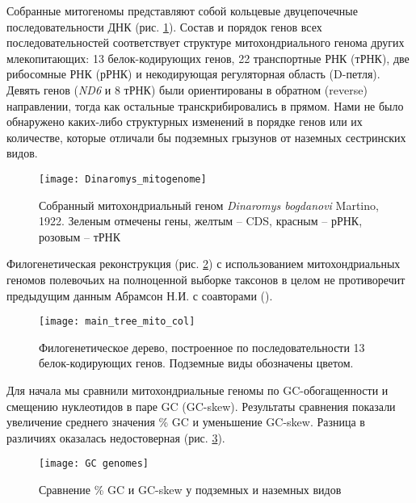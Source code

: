 Собранные митогеномы представляют собой кольцевые двуцепочечные последовательности ДНК (рис. \ref{mitogenome}). Состав и порядок генов всех последовательностей соответствует структуре митохондриального генома других млекопитающих: 13 белок-кодирующих генов, 22 транспортные РНК (тРНК), две рибосомные РНК (рРНК) и некодирующая регуляторная область (D-петля). Девять генов (\textit{ND6} и 8 тРНК) были ориентированы в обратном (reverse) направлении, тогда как остальные транскрибировались в прямом. Нами не было обнаружено каких-либо структурных изменений в порядке генов или их количестве, которые отличали бы подземных грызунов от наземных сестринских видов.

\begin{figure}[h!]
	\begin{center}
		\texttt{[image: Dinaromys\_mitogenome]}
	\end{center}
	\caption{Собранный митохондриальный геном \textit{Dinaromys bogdanovi} Martino, 1922. Зеленым отмечены гены, желтым -- CDS, красным -- рРНК, розовым -- тРНК}\label{mitogenome}
\end{figure}

Филогенетическая реконструкция (рис. \ref{Tree_13_genes}) с использованием митохондриальных геномов полевочьих на полноценной выборке таксонов в целом не противоречит предыдущим данным Абрамсон Н.И. с соавторами (\cite{Abramson2009}).  

\begin{figure}[h!]
\begin{center}
	\texttt{[image: main\_tree\_mito\_col]}
\end{center}
	\caption{Филогенетическое дерево, построенное по последовательности 13 белок-кодирующих генов. Подземные виды обозначены цветом.}
	\label{Tree_13_genes}
\end{figure}


Для начала мы сравнили митохондриальные геномы по GC-обогащенности и смещению нуклеотидов в паре GC (GC-skew). Результаты сравнения показали увеличение среднего значения \% GC и уменьшение GC-skew. Разница в различиях оказалась недостоверная (рис. \ref{boxplot_GC_GSskew}). 

\begin{figure}[h!]
\begin{center}
	\texttt{[image: GC genomes]}
\end{center}
\caption{Сравнение \% GC и GC-skew у подземных и наземных видов}\label{boxplot_GC_GSskew}
\end{figure}


